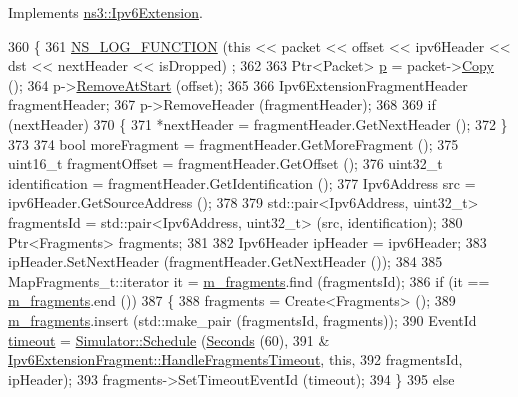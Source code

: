 Implements \hyperlink{classns3_1_1Ipv6Extension_a5946bc5e6fa07b76e2dcb7e4dee01f9f}{ns3\+::\+Ipv6\+Extension}.


\begin{DoxyCode}
360 \{
361   \hyperlink{log-macros-disabled_8h_a90b90d5bad1f39cb1b64923ea94c0761}{NS\_LOG\_FUNCTION} (\textcolor{keyword}{this} << packet << offset << ipv6Header << dst << nextHeader << isDropped)
      ;
362 
363   Ptr<Packet> \hyperlink{lte__link__budget_8m_ac9de518908a968428863f829398a4e62}{p} = packet->\hyperlink{classns3_1_1Packet_a5d5c70802a5f77fc5f0001e0cfc1898b}{Copy} ();
364   p->\hyperlink{classns3_1_1Packet_a78aa207e7921dd2f9f7e0d0b7a1c730a}{RemoveAtStart} (offset);
365 
366   Ipv6ExtensionFragmentHeader fragmentHeader;
367   p->RemoveHeader (fragmentHeader);
368 
369   \textcolor{keywordflow}{if} (nextHeader)
370     \{
371       *nextHeader = fragmentHeader.GetNextHeader ();
372     \}
373 
374   \textcolor{keywordtype}{bool} moreFragment = fragmentHeader.GetMoreFragment ();
375   uint16\_t fragmentOffset = fragmentHeader.GetOffset ();
376   uint32\_t identification = fragmentHeader.GetIdentification ();
377   Ipv6Address src = ipv6Header.GetSourceAddress ();
378 
379   std::pair<Ipv6Address, uint32\_t> fragmentsId = std::pair<Ipv6Address, uint32\_t> (src, identification);
380   Ptr<Fragments> fragments;
381 
382   Ipv6Header ipHeader = ipv6Header;
383   ipHeader.SetNextHeader (fragmentHeader.GetNextHeader ());
384 
385   MapFragments\_t::iterator it = \hyperlink{classns3_1_1Ipv6ExtensionFragment_aa830df260b53ecc85fd602a558232f7f}{m\_fragments}.find (fragmentsId);
386   \textcolor{keywordflow}{if} (it == \hyperlink{classns3_1_1Ipv6ExtensionFragment_aa830df260b53ecc85fd602a558232f7f}{m\_fragments}.end ())
387     \{
388       fragments = Create<Fragments> ();
389       \hyperlink{classns3_1_1Ipv6ExtensionFragment_aa830df260b53ecc85fd602a558232f7f}{m\_fragments}.insert (std::make\_pair (fragmentsId, fragments));
390       EventId \hyperlink{openflow-switch_8cc_a386d174ae121d1cfa279074b7e209714}{timeout} = \hyperlink{classns3_1_1Simulator_a671882c894a08af4a5e91181bf1eec13}{Simulator::Schedule} (\hyperlink{group__timecivil_ga33c34b816f8ff6628e33d5c8e9713b9e}{Seconds} (60),
391                                              &
      \hyperlink{classns3_1_1Ipv6ExtensionFragment_a4676eb2d539562fe8b25f6711f120718}{Ipv6ExtensionFragment::HandleFragmentsTimeout}, \textcolor{keyword}{this},
392                                              fragmentsId, ipHeader);
393       fragments->SetTimeoutEventId (timeout);
394     \}
395   \textcolor{keywordflow}{else}

\end{DoxyCode}

